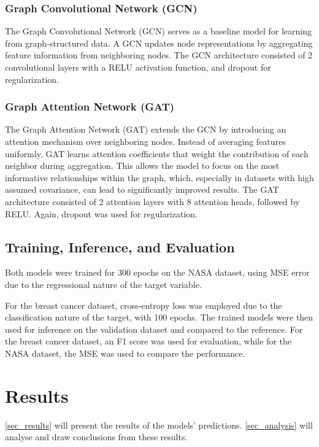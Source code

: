 \documentclass[12pt]{article}
\begin{document}
\subsubsection{Graph Convolutional Network (GCN)}
The Graph Convolutional Network (GCN) serves as a baseline model for learning from graph-structured data. A GCN updates node representations by aggregating feature information from neighboring nodes.
The GCN architecture consisted of 2 convolutional layers with a RELU activation function, and dropout for regularization.

\subsubsection{Graph Attention Network (GAT)}
The Graph Attention Network (GAT) extends the GCN by introducing an attention mechanism over neighboring nodes. Instead of averaging features uniformly, GAT learns attention coefficients that weight the contribution of each neighbor during aggregation. This allows the model to focus on the most informative relationships within the graph, which, especially in datasets with high assumed covariance, can lead to significantly improved results.
The GAT architecture consisted of 2 attention layers with 8 attention heads, followed by RELU. Again, dropout was used for regularization.

\subsection{Training, Inference, and Evaluation}
Both models were trained for 300 epochs on the NASA dataset, using MSE error due to the regressional nature of the target variable.

For the breast cancer dataset, cross-entropy loss was employed due to the classification nature of the target, with 100 epochs.
The trained models were then used for inference on the validation dataset and compared to the reference. For the breast cancer dataset, an F1 score was used for evaluation, while for the NASA dataset, the MSE was used to compare the performance.
\pagebreak

\section{Results} \label{sec_results}
\autoref{sec_results} will present the results of the models' predictions. \autoref{sec_analysis} will analyse and draw conclusions from these results.
\end{document}
